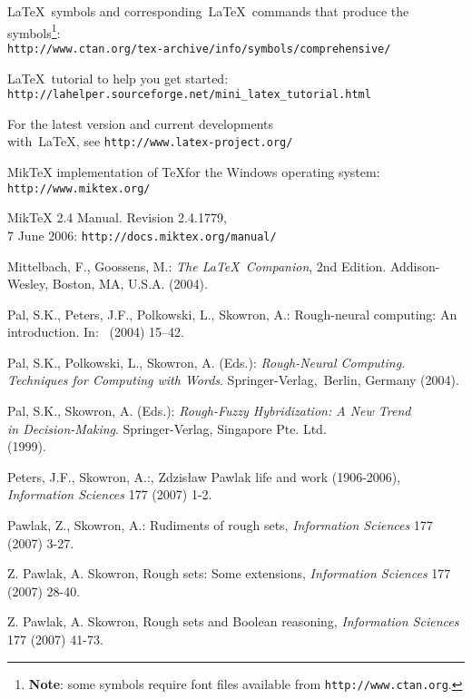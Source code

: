 \documentclass{llncs}
\begin{document}
\begin{thebibliography}{99}
 \LaTeX~symbols and corresponding~\LaTeX~commands that produce the symbols\footnote{{\bf Note}: some symbols require font files available from \texttt{http://www.ctan.org}.}:\\
\texttt{http://www.ctan.org/tex-archive/info/symbols/comprehensive/}

 \LaTeX~tutorial to help you get started:\\
\texttt{http://lahelper.sourceforge.net/mini\_{}latex\_{}tutorial.html}

 For the latest version and current developments\\ with~\LaTeX, see \texttt{http://www.latex-project.org/}

 MikTeX implementation of \TeX for the Windows operating system:\\
\texttt{http://www.miktex.org/}

 MikTeX 2.4 Manual. Revision 2.4.1779,\\ 7 June 2006:
\texttt{http://docs.miktex.org/manual/}

 Mittelbach, F., Goossens, M.:
\emph{The \LaTeX ~Companion}, 2nd Edition.  Addison-Wesley, Boston, MA, U.S.A. (2004).

 Pal, S.K., Peters, J.F., Polkowski, L., Skowron, A.:
Rough-neural computing: An introduction.  In:~\cite{book03} (2004) 15--42.

 Pal, S.K., Polkowski, L., Skowron, A. (Eds.):
\emph{Rough-Neural Computing.  Techniques for Computing with Words}.
Springer-Verlag,~Berlin, Germany (2004).

 Pal, S.K., Skowron, A. (Eds.): \emph{Rough-Fuzzy Hybridization: A New Trend\\ in Decision-Making}. Springer-Verlag, Singapore Pte. Ltd.\\ (1999).

 Peters, J.F., Skowron, A.:, Zdzis{\l}aw Pawlak life and work (1906-2006), \emph{Information Sciences} 177 (2007) 1-2.

 Pawlak, Z., Skowron, A.: Rudiments of rough sets, \emph{Information Sciences} 177 (2007) 3-27.

 Z. Pawlak, A. Skowron, Rough sets: Some extensions, \emph{Information Sciences} 177 (2007) 28-40.

 Z. Pawlak, A. Skowron, Rough sets and Boolean reasoning, \emph{Information Sciences} 177 (2007) 41-73.


\end{thebibliography}
\end{document}
